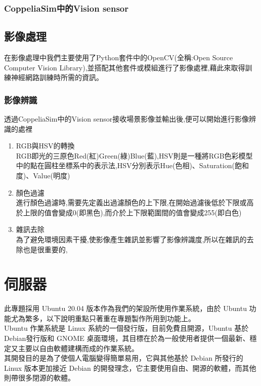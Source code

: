 \documentclass[14pt,a4paper]{report}  %
\begin{document}
\subsection{CoppeliaSim中的Vision sensor}

\section{影像處理}
 在影像處理中我們主要使用了Python套件中的OpenCV(全稱:Open Source Computer Vision Library),並搭配其他套件或模組進行了影像處裡,藉此來取得訓練神經網路訓練時所需的資訊。\\
\subsection{影像辨識}
 透過CoppeliaSim中的Vision sensor接收場景影像並輸出後,便可以開始進行影像辨識的處裡\\
\begin{enumerate}
\item RGB與HSV的轉換\\
RGB即光的三原色Red(紅)Green(綠)Blue(藍),HSV則是一種將RGB色彩模型中的點在圓柱坐標系中的表示法,HSV分別表示Hue(色相)、Saturation(飽和度)、Value(明度)\\
\item 顏色過濾\\
進行顏色過濾時,需要先定義出過濾顏色的上下限,在開始過濾後低於下限或高於上限的值會變成0(即黑色),而介於上下限範圍間的值會變成255(即白色)
\item 雜訊去除\\
為了避免環境因素干擾,使影像產生雜訊並影響了影像辨識度,所以在雜訊的去除也是很重要的,
\end{enumerate}
\newpage
\chapter{伺服器}
 此專題採用 Ubuntu 20.04 版本作為我們的架設所使用作業系統，由於 Ubuntu 功能尤為繁多，以下說明重點只著重在專題製作所用到功能上。\\
 
 Ubuntu 作業系統是 Linux 系統的一個發行版，目前免費且開源，Ubuntu 基於 Debian發行版和 GNOME 桌面環境，其目標在於為一般使用者提供一個最新、穩定又主要以自由軟體建構而成的作業系統。\\
 
 其開發目的是為了使個人電腦變得簡單易用，它與其他基於 Debian 所發行的 Linux 版本更加接近 Debian 的開發理念，它主要使用自由、開源的軟體，而其他則帶很多閉源的軟體。\\
\end{document}
